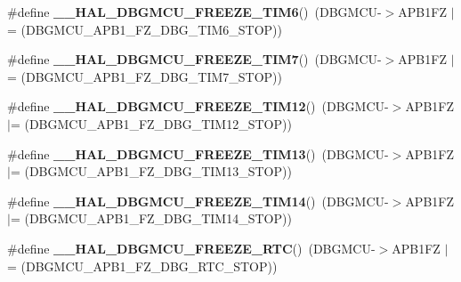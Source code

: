 \begin{DoxyCompactItemize}
\item 
\#define {\bfseries \+\_\+\+\_\+\+H\+A\+L\+\_\+\+D\+B\+G\+M\+C\+U\+\_\+\+F\+R\+E\+E\+Z\+E\+\_\+\+T\+I\+M6}()~(D\+B\+G\+M\+CU-\/$>$A\+P\+B1\+FZ $\vert$= (D\+B\+G\+M\+C\+U\+\_\+\+A\+P\+B1\+\_\+\+F\+Z\+\_\+\+D\+B\+G\+\_\+\+T\+I\+M6\+\_\+\+S\+T\+OP))\hypertarget{group___h_a_l___exported___macros_gaccdcfde9ae6f78f0ca359776b021f87c}{}\label{group___h_a_l___exported___macros_gaccdcfde9ae6f78f0ca359776b021f87c}

\item 
\#define {\bfseries \+\_\+\+\_\+\+H\+A\+L\+\_\+\+D\+B\+G\+M\+C\+U\+\_\+\+F\+R\+E\+E\+Z\+E\+\_\+\+T\+I\+M7}()~(D\+B\+G\+M\+CU-\/$>$A\+P\+B1\+FZ $\vert$= (D\+B\+G\+M\+C\+U\+\_\+\+A\+P\+B1\+\_\+\+F\+Z\+\_\+\+D\+B\+G\+\_\+\+T\+I\+M7\+\_\+\+S\+T\+OP))\hypertarget{group___h_a_l___exported___macros_ga8541da9b4d428d41e218e9701e4307d1}{}\label{group___h_a_l___exported___macros_ga8541da9b4d428d41e218e9701e4307d1}

\item 
\#define {\bfseries \+\_\+\+\_\+\+H\+A\+L\+\_\+\+D\+B\+G\+M\+C\+U\+\_\+\+F\+R\+E\+E\+Z\+E\+\_\+\+T\+I\+M12}()~(D\+B\+G\+M\+CU-\/$>$A\+P\+B1\+FZ $\vert$= (D\+B\+G\+M\+C\+U\+\_\+\+A\+P\+B1\+\_\+\+F\+Z\+\_\+\+D\+B\+G\+\_\+\+T\+I\+M12\+\_\+\+S\+T\+OP))\hypertarget{group___h_a_l___exported___macros_ga2bbe99ec741228b520e17b1bf38eb2ad}{}\label{group___h_a_l___exported___macros_ga2bbe99ec741228b520e17b1bf38eb2ad}

\item 
\#define {\bfseries \+\_\+\+\_\+\+H\+A\+L\+\_\+\+D\+B\+G\+M\+C\+U\+\_\+\+F\+R\+E\+E\+Z\+E\+\_\+\+T\+I\+M13}()~(D\+B\+G\+M\+CU-\/$>$A\+P\+B1\+FZ $\vert$= (D\+B\+G\+M\+C\+U\+\_\+\+A\+P\+B1\+\_\+\+F\+Z\+\_\+\+D\+B\+G\+\_\+\+T\+I\+M13\+\_\+\+S\+T\+OP))\hypertarget{group___h_a_l___exported___macros_ga21bfaea50e429031982861b2869c6863}{}\label{group___h_a_l___exported___macros_ga21bfaea50e429031982861b2869c6863}

\item 
\#define {\bfseries \+\_\+\+\_\+\+H\+A\+L\+\_\+\+D\+B\+G\+M\+C\+U\+\_\+\+F\+R\+E\+E\+Z\+E\+\_\+\+T\+I\+M14}()~(D\+B\+G\+M\+CU-\/$>$A\+P\+B1\+FZ $\vert$= (D\+B\+G\+M\+C\+U\+\_\+\+A\+P\+B1\+\_\+\+F\+Z\+\_\+\+D\+B\+G\+\_\+\+T\+I\+M14\+\_\+\+S\+T\+OP))\hypertarget{group___h_a_l___exported___macros_gaf4d10c15c1644eeff138829af21c219c}{}\label{group___h_a_l___exported___macros_gaf4d10c15c1644eeff138829af21c219c}

\item 
\#define {\bfseries \+\_\+\+\_\+\+H\+A\+L\+\_\+\+D\+B\+G\+M\+C\+U\+\_\+\+F\+R\+E\+E\+Z\+E\+\_\+\+R\+TC}()~(D\+B\+G\+M\+CU-\/$>$A\+P\+B1\+FZ $\vert$= (D\+B\+G\+M\+C\+U\+\_\+\+A\+P\+B1\+\_\+\+F\+Z\+\_\+\+D\+B\+G\+\_\+\+R\+T\+C\+\_\+\+S\+T\+OP))\hypertarget{group___h_a_l___exported___macros_ga6ea586c594feb6eb0f2aba52f1c69f4c}{}\label{group___h_a_l___exported___macros_ga6ea586c594feb6eb0f2aba52f1c69f4c}


\end{DoxyCompactItemize}
